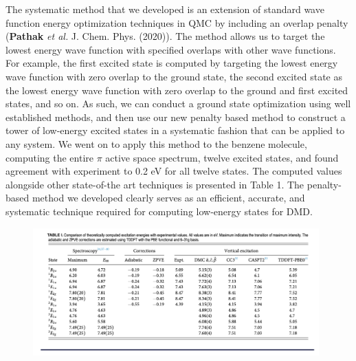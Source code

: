 \documentclass{article}
\begin{document}
The systematic method that we developed is an extension of standard wave function energy optimization techniques in QMC by including an overlap penalty (\textbf{Pathak} \textit{et al.} J. Chem. Phys. (2020)).
The method allows us to target the lowest energy wave function with specified overlaps with other wave functions.
For example, the first excited state is computed by targeting the lowest energy wave function with zero overlap to the ground state, the second excited state as the lowest energy wave function with zero overlap to the ground and first excited states, and so on.
As such, we can conduct a ground state optimization using well established methods, and then use our new penalty based method to construct a tower of low-energy excited states in a systematic fashion that can be applied to any system.
We went on to apply this method to the benzene molecule, computing the entire $\pi$ active space spectrum, twelve excited states, and found agreement with experiment to 0.2 eV for all twelve states.
The computed values alongside other state-of-the art techniques is presented in Table 1.
The penalty-based method we developed clearly serves as an efficient, accurate, and systematic technique required for computing low-energy states for DMD.
\begin{figure}
	\includegraphics[width=0.98\textwidth]{benzene.png}
\end{figure}
\end{document}

